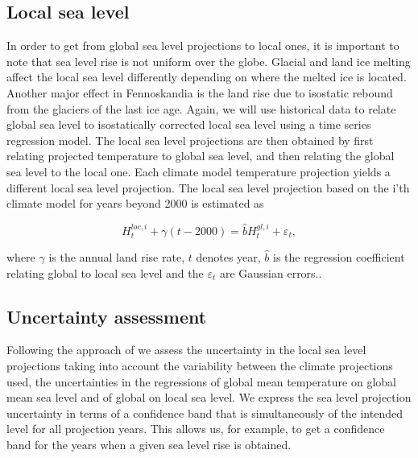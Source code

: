 \documentclass[draft,linenumbers]{agujournal}
\begin{document}
\subsection{Local sea level}
In order to get from global sea level projections to local ones, it is important to note that sea level rise is not uniform over the globe. Glacial and land ice melting affect the local sea level differently depending on where the melted ice is located.
Another major effect in Fennoskandia is the land rise due to isostatic rebound from the glaciers of the last ice age. 
Again, we will use historical data to relate global sea level to isostatically corrected local sea level using a time series regression model. 
The local sea level projections are then obtained by first relating projected temperature to global sea level, and then relating the global sea level to the local one. Each climate model temperature projection yields a different local sea level projection. The local sea level projection based on the i'th climate model for years beyond 2000 is estimated as
\begin{linenomath*}
\[H_t^{loc,i} + \gamma (t -2000 ) = {\hat b} H_t^{gl,i}  + {\varepsilon _t},\]
\end{linenomath*}
where $\gamma$ is the annual land rise rate, $t$ denotes year,  $ {\hat b} $ is the regression coefficient relating global to local sea level and the $\varepsilon _t$ are Gaussian errors..

\subsection{Uncertainty assessment}
\label{unc_ass}
Following the approach of \citet{Guttorp2014} we assess the uncertainty in the local sea level projections taking into account the variability between the climate projections used, the uncertainties in the regressions of global mean temperature on global mean sea level and of global on local sea level. We express the sea level projection uncertainty in terms of a confidence band that is simultaneously of the intended  level  for all projection years. This allows us, for example, to get a confidence band for the years when a given sea level rise is obtained. 
\end{document}
